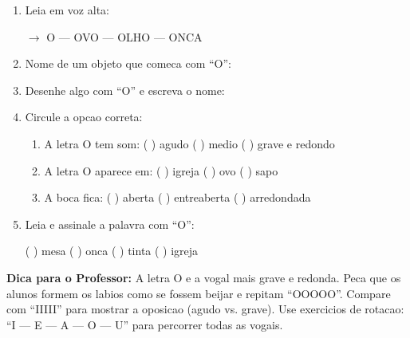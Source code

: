 \begin{exercicio}
\begin{enumerate}[resume]
  \item Leia em voz alta:
  \begin{center}
  $\rightarrow$ O --- OVO --- OLHO --- ONCA
  \end{center}

  \item Nome de um objeto que comeca com ``O'':
  \begin{center}
  \underline{\hspace{6cm}}
  \end{center}

  \item Desenhe algo com ``O'' e escreva o nome:
  \begin{center}
  \end{center}

  \item Circule a opcao correta:
  \begin{enumerate}[label=(\alph*)]
    \item A letra O tem som: ( ) agudo ( ) medio ( ) grave e redondo
    \item A letra O aparece em: ( ) igreja ( ) ovo ( ) sapo
    \item A boca fica: ( ) aberta ( ) entreaberta ( ) arredondada
  \end{enumerate}

  \item Leia e assinale a palavra com ``O'':
  \begin{center}
  ( ) mesa \quad ( ) onca \quad ( ) tinta \quad ( ) igreja
  \end{center}
\end{enumerate}
\end{exercicio}

\begin{dica}
\textbf{Dica para o Professor:} A letra O e a vogal mais grave e redonda. Peca que os alunos formem os labios como se fossem beijar e repitam ``OOOOO''. Compare com ``IIIII'' para mostrar a oposicao (agudo vs. grave). Use exercicios de rotacao: ``I --- E --- A --- O --- U'' para percorrer todas as vogais.
\end{dica}



